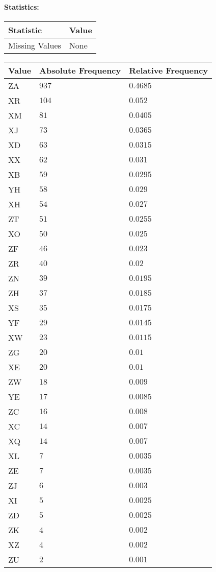 \paragraph{Statistics: }
\begin{table}[H]
	\renewcommand{\arraystretch}{1.25}
	\begin{tabular}{l|l}
		\textbf{Statistic} & \textbf{Value}\\\hline
		Missing Values& None\\\hline
	\end{tabular}
\end{table}
\begin{table}[H]
	\renewcommand{\arraystretch}{1.25}
	\begin{tabular}{l|l|l}
		\textbf{Value} & \textbf{Absolute Frequency} & \textbf{Relative Frequency}\\\hline
		ZA&$937$&$0.4685$\\\hline
		XR&$104$&$0.052$\\\hline
		XM&$81$&$0.0405$\\\hline
		XJ&$73$&$0.0365$\\\hline
		XD&$63$&$0.0315$\\\hline
		XX&$62$&$0.031$\\\hline
		XB&$59$&$0.0295$\\\hline
		YH&$58$&$0.029$\\\hline
		XH&$54$&$0.027$\\\hline
		ZT&$51$&$0.0255$\\\hline
		XO&$50$&$0.025$\\\hline
		ZF&$46$&$0.023$\\\hline
		ZR&$40$&$0.02$\\\hline
		ZN&$39$&$0.0195$\\\hline
		ZH&$37$&$0.0185$\\\hline
		XS&$35$&$0.0175$\\\hline
		YF&$29$&$0.0145$\\\hline
		XW&$23$&$0.0115$\\\hline
		ZG&$20$&$0.01$\\\hline
		XE&$20$&$0.01$\\\hline
		ZW&$18$&$0.009$\\\hline
		YE&$17$&$0.0085$\\\hline
		ZC&$16$&$0.008$\\\hline
		XC&$14$&$0.007$\\\hline
		XQ&$14$&$0.007$\\\hline
		XL&$7$&$0.0035$\\\hline
		ZE&$7$&$0.0035$\\\hline
		ZJ&$6$&$0.003$\\\hline
		XI&$5$&$0.0025$\\\hline
		ZD&$5$&$0.0025$\\\hline
		ZK&$4$&$0.002$\\\hline
		XZ&$4$&$0.002$\\\hline
		ZU&$2$&$0.001$
	\end{tabular}
\end{table}

